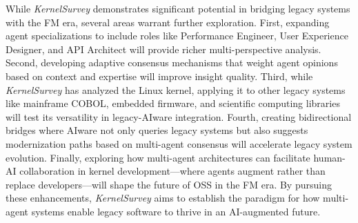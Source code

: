 While \emph{KernelSurvey} demonstrates significant potential in bridging legacy systems with the FM era, several areas warrant further exploration. First, expanding agent specializations to include roles like Performance Engineer, User Experience Designer, and API Architect will provide richer multi-perspective analysis. Second, developing adaptive consensus mechanisms that weight agent opinions based on context and expertise will improve insight quality. Third, while \emph{KernelSurvey} has analyzed the Linux kernel, applying it to other legacy systems like mainframe COBOL, embedded firmware, and scientific computing libraries will test its versatility in legacy-AIware integration. Fourth, creating bidirectional bridges where AIware not only queries legacy systems but also suggests modernization paths based on multi-agent consensus will accelerate legacy system evolution. Finally, exploring how multi-agent architectures can facilitate human-AI collaboration in kernel development—where agents augment rather than replace developers—will shape the future of OSS in the FM era. By pursuing these enhancements, \emph{KernelSurvey} aims to establish the paradigm for how multi-agent systems enable legacy software to thrive in an AI-augmented future.

% 
% 